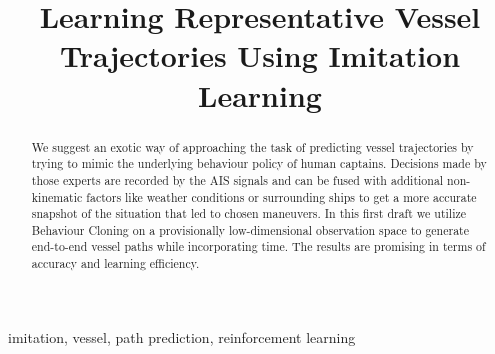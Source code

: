 \documentclass[conference]{IEEEtran}
\begin{document}
\title{Learning Representative Vessel Trajectories Using Imitation Learning\\}

\author{
}

\maketitle

\begin{abstract}
We suggest an exotic way of approaching the task of predicting vessel trajectories by trying to mimic the underlying behaviour policy of human captains. Decisions made by those experts are recorded by the AIS signals and can be fused with additional non-kinematic factors like weather conditions or surrounding ships to get a more accurate snapshot of the situation that led to chosen maneuvers. In this first draft we utilize Behaviour Cloning on a provisionally low-dimensional observation space to generate end-to-end vessel paths while incorporating time. The results are promising in terms of accuracy and learning efficiency.
\end{abstract}

\begin{IEEEkeywords}
imitation, vessel, path prediction, reinforcement learning
\end{IEEEkeywords}
\end{document}
